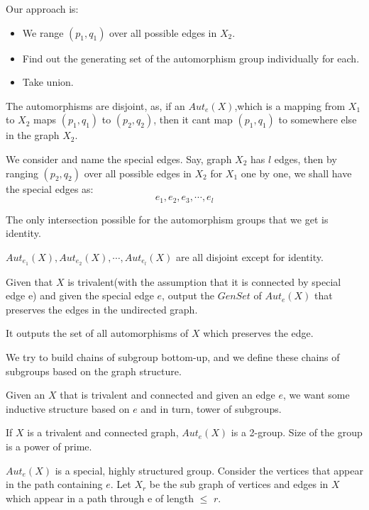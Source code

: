 Our approach is:
\begin{itemize}
\item We range $(p_1,q_1)$ over all possible edges in $X_2$. 
\item Find out the generating set of the automorphism group individually for each. 
\item Take union.
\end{itemize}
The automorphisms are disjoint, as, if an $Aut_e(X)$,which is a mapping from $X_1$ to $X_2$ maps $(p_1,q_1)$ to $(p_2,q_2)$, then it cant map $(p_1,q_1)$ to somewhere else in the graph $X_2$.
  
  We consider and name the special edges. Say, graph $X_2$ has $l$ edges, then by ranging $(p_2,q_2)$ over all possible edges in $X_2$ for $X_1$ one by one, we shall have the special edges as:
   \[ e_1, e_2 , e_3,\cdots,e_l\]
  \begin{observation} The only intersection possible for the automorphism groups that we get is identity.
  \end{observation}
  $ Aut_{e_{1}}(X), Aut_{e_{2}}(X),\cdots,Aut_{e_{l}}(X)$ are all disjoint except for identity.
  
  \begin{problem} Given that $X$ is trivalent(with the assumption that it is connected by special edge e) and  given the special edge $e$, output the $GenSet$ of $Aut_e(X)$ that preserves the edges in the undirected graph.
  \end{problem}
  
  It outputs the set of all automorphisms of  $X$ which preserves the edge.
  
  
  We try to build chains of subgroup bottom-up, and we define these chains of subgroups based on the graph structure.
  
  
  Given an $X$ that is trivalent and connected and given an edge $e$, we want some inductive structure based on $e$ and in turn, tower of subgroups.
  
  
  
  
   
\begin{theorem} If $X$ is a trivalent and connected graph, $Aut_e(X)$ is a 2-group. Size of the group is a power of prime.
\end{theorem}
 
$Aut_e(X)$ is a special, highly structured group. Consider the vertices that appear in the path containing $e$.
Let $X_r$ be the sub graph of vertices and edges in $X$ which appear in a path through e of length $\leqslant$ $r$.


